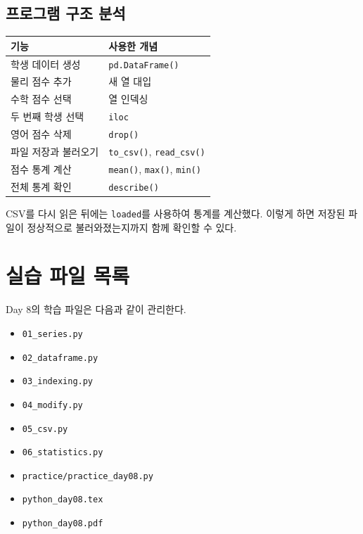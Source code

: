 \documentclass[11pt,a4paper]{article}
\begin{document}
\subsection{프로그램 구조 분석}

\begin{center}
\begin{tabular}{ll}
\toprule
기능 & 사용한 개념 \\
\midrule
학생 데이터 생성 & \texttt{pd.DataFrame()} \\
물리 점수 추가 & 새 열 대입 \\
수학 점수 선택 & 열 인덱싱 \\
두 번째 학생 선택 & \texttt{iloc} \\
영어 점수 삭제 & \texttt{drop()} \\
파일 저장과 불러오기 & \texttt{to\_csv()}, \texttt{read\_csv()} \\
점수 통계 계산 & \texttt{mean()}, \texttt{max()}, \texttt{min()} \\
전체 통계 확인 & \texttt{describe()} \\
\bottomrule
\end{tabular}
\end{center}

\begin{importantbox}
CSV를 다시 읽은 뒤에는 \texttt{loaded}를 사용하여 통계를 계산했다. 이렇게 하면 저장된 파일이 정상적으로 불러와졌는지까지 함께 확인할 수 있다.
\end{importantbox}

\section{실습 파일 목록}

\begin{practicebox}
Day 8의 학습 파일은 다음과 같이 관리한다.
\begin{itemize}[leftmargin=1.5em]
    \item \texttt{01\_series.py}
    \item \texttt{02\_dataframe.py}
    \item \texttt{03\_indexing.py}
    \item \texttt{04\_modify.py}
    \item \texttt{05\_csv.py}
    \item \texttt{06\_statistics.py}
    \item \texttt{practice/practice\_day08.py}
    \item \texttt{python\_day08.tex}
    \item \texttt{python\_day08.pdf}
\end{itemize}
\end{practicebox}
\end{document}
